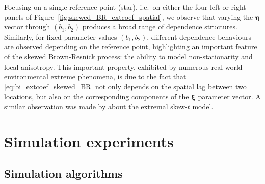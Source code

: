 \documentclass[12pt]{article}
\begin{document}
Focusing on a single reference point (star), i.e.~on either the four left or right panels of Figure~\ref{fig:skewed_BR_extcoef_spatial}, we observe that varying the $\bm \eta$ vector through $(b_1, b_2)$ produces a broad range of dependence structures. Similarly, for fixed parameter values $(b_1,b_2)$, different dependence behaviours are observed depending on the reference point, 
highlighting
an important feature of the skewed Brown-Resnick process: the ability to model non-stationarity and local anisotropy. This important property, exhibited by numerous real-world environmental extreme phenomena, is due to the fact that \eqref{eq:bi_extcoef_skewed_BR} not only depends on the spatial lag between two locations, but also on the corresponding components of the $\bm \xi$ parameter vector. A similar observation was made by \citet{Beranger.etal:2017} about the extremal skew-$t$ model.

\section{Simulation experiments}
\label{sec:sim}

\subsection{Simulation algorithms}
\end{document}
